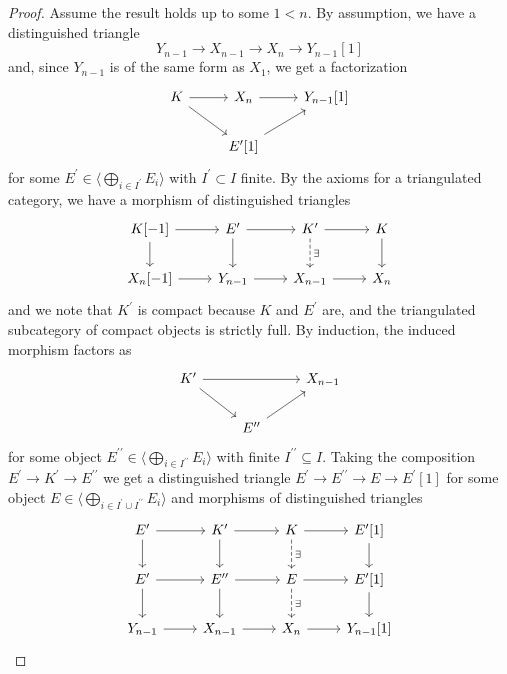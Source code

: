 \documentclass[10pt]{amsart}
\begin{document}
\begin{lem}
\begin{proof}
    Assume the result holds up to some $1 < n$.
    By assumption, we have a distinguished triangle
    $$Y_{n-1} \rightarrow X_{n-1} \rightarrow X_{n} \rightarrow Y_{n-1}[1]$$
    and, since $Y_{n-1}$ is of the same form as $X_1$, we get a factorization
    $$\begin{tikzcd}
      K \arrow{rd}\arrow{r} & X_n \arrow{r} & Y_{n-1}[1]\\
      & E^\prime[1]\arrow{ur}
    \end{tikzcd}$$
    for some $E^\prime \in \langle \bigoplus_{i \in I^\prime}E_i \rangle$ with $I^\prime \subset I$ finite.
    By the axioms for a triangulated category, we have a morphism of distinguished triangles
    $$\begin{tikzcd}
      K[-1] \arrow{d}\arrow{r} & E^\prime \arrow{r}\arrow{d} & K^\prime \arrow{r}\arrow[dashed]{d}{\exists} & K\arrow{d}\\
      X_n[-1] \arrow{r} & Y_{n-1} \arrow{r} & X_{n-1} \arrow{r} & X_n
    \end{tikzcd}$$
    and we note that $K^\prime$ is compact because $K$ and $E^\prime$ are, and the triangulated subcategory of compact objects is strictly full.
    By induction, the induced morphism factors as
    $$\begin{tikzcd}
      K^\prime \arrow{rr}\arrow{rd} & & X_{n-1}\\
      & E^{\prime\prime}\arrow{ur}
    \end{tikzcd}$$
    for some object $E^{\prime\prime} \in \langle \bigoplus_{i \in I^{\prime\prime}} E_i \rangle$ with finite $I^{\prime\prime} \subseteq I$.
    Taking the composition $E^\prime \rightarrow K^\prime \rightarrow E^{\prime\prime}$ we get a distinguished triangle $E^\prime \rightarrow E^{\prime\prime} \rightarrow E \rightarrow E^\prime[1]$ for some object $E \in \langle \bigoplus_{i \in I^\prime \cup I^{\prime\prime}}E_i\rangle$ and morphisms of distinguished triangles
    $$\begin{tikzcd}
      E^\prime \arrow{r}\arrow{d} & K^\prime \arrow{r}\arrow{d} & K \arrow{r}\arrow[dashed]{d}{\exists} & E^\prime[1]\arrow{d}\\
      E^\prime \arrow{r}\arrow{d} & E^{\prime\prime} \arrow{r}\arrow{d} & E \arrow{r}\arrow[dashed]{d}{\exists} & E^\prime[1]\arrow{d}\\
      Y_{n-1} \arrow{r} & X_{n-1} \arrow{r} & X_n \arrow{r} & Y_{n-1}[1]
    \end{tikzcd}$$
    

\end{proof}
\end{lem}
\end{document}
